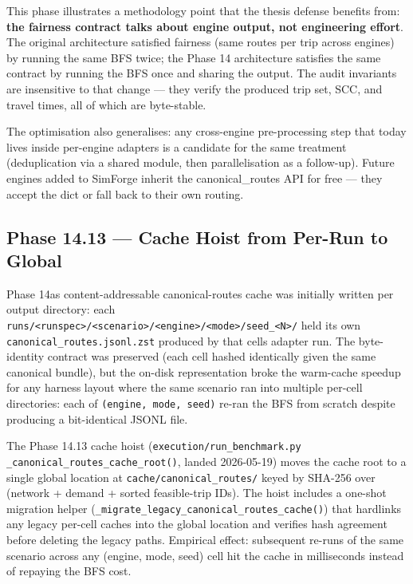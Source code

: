 This phase illustrates a methodology point that the thesis defense
benefits from: \textbf{the fairness contract talks about engine output,
not engineering effort}. The original architecture satisfied fairness
(same routes per trip across engines) by running the same BFS twice; the
Phase 14 architecture satisfies the same contract by running the BFS
once and sharing the output. The audit invariants are insensitive to
that change --- they verify the produced trip set, SCC, and travel
times, all of which are byte-stable.

The optimisation also generalises: any cross-engine pre-processing step
that today lives inside per-engine adapters is a candidate for the same
treatment (deduplication via a shared module, then parallelisation as a
follow-up). Future engines added to SimForge inherit the
canonical\_routes API for free --- they accept the dict or fall back to
their own routing.

\subsection{Phase 14.13 --- Cache Hoist from Per-Run to
Global}\label{387-phase-1413--cache-hoist-from-per-run-to-global}

Phase 14a\textquotesingle s content-addressable canonical-routes cache
was initially written per output directory: each
\texttt{runs/\textless{}runspec\textgreater{}/\textless{}scenario\textgreater{}/\textless{}engine\textgreater{}/\textless{}mode\textgreater{}/seed\_\textless{}N\textgreater{}/}
held its own \texttt{canonical\_routes.jsonl.zst} produced by that
cell\textquotesingle s adapter run. The byte-identity contract was
preserved (each cell hashed identically given the same canonical
bundle), but the on-disk representation broke the warm-cache speedup for
any harness layout where the same scenario ran into multiple per-cell
directories: each of \texttt{(engine,\ mode,\ seed)} re-ran the BFS from
scratch despite producing a bit-identical JSONL file.

The Phase 14.13 cache hoist (\texttt{execution/run\_benchmark.py}
\texttt{\_canonical\_routes\_cache\_root()}, landed 2026-05-19) moves
the cache root to a single global location at
\texttt{cache/canonical\_routes/} keyed by SHA-256 over (network +
demand + sorted feasible-trip IDs). The hoist includes a one-shot
migration helper
(\texttt{\_migrate\_legacy\_canonical\_routes\_cache()}) that hardlinks
any legacy per-cell caches into the global location and verifies hash
agreement before deleting the legacy paths. Empirical effect: subsequent
re-runs of the same scenario across any (engine, mode, seed) cell hit
the cache in milliseconds instead of repaying the BFS cost.

